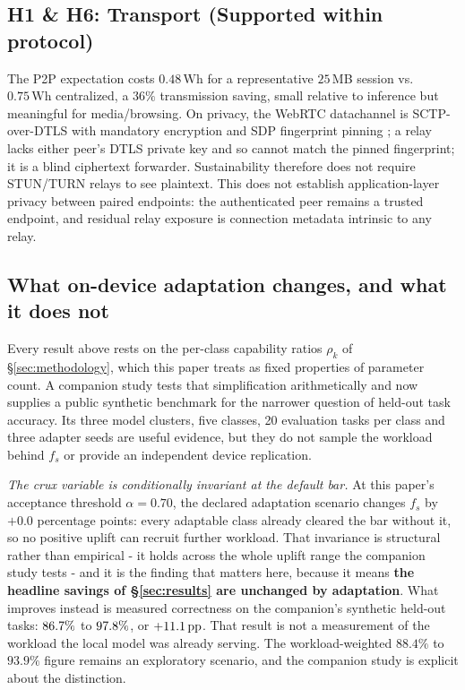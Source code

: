 \documentclass[conference]{IEEEtran}
\newcommand{\Wh}{\,\text{Wh}}
\newcommand{\pp}{\,\text{pp}}
\newcommand{\fs}{f_{s}}
\begin{document}
\subsection{H1 \& H6: Transport (Supported within protocol)}
The P2P expectation costs $0.48\Wh$ for a representative $25$\,MB session vs.\
$0.75\Wh$ centralized, a $36\%$ transmission saving, small relative to inference
but meaningful for media/browsing. On privacy, the WebRTC datachannel is
SCTP-over-DTLS with mandatory encryption and SDP fingerprint pinning
\cite{rfc8831,rfc8827}; a relay lacks either peer's DTLS private key and so
cannot match the pinned fingerprint; it is a blind ciphertext forwarder.
Sustainability therefore does not require STUN/TURN relays to see plaintext.
This does not establish application-layer privacy between paired endpoints:
the authenticated peer remains a trusted endpoint, and residual relay exposure is
connection metadata intrinsic to any relay.

\subsection{What on-device adaptation changes, and what it does not}
\label{sec:pass3}
Every result above rests on the per-class capability ratios $\rho_k$ of
\S\ref{sec:methodology}, which this paper treats as fixed properties of
parameter count. A companion study \cite{autoyou2026adaptation} tests that
simplification arithmetically and now supplies a public synthetic benchmark
for the narrower question of held-out task accuracy. Its three model clusters,
five classes, 20 evaluation tasks per class and three adapter seeds are useful
evidence, but they do not sample the workload behind $\fs$ or provide an
independent device replication.

\emph{The crux variable is conditionally invariant at the default bar.} At this
paper's acceptance threshold $\alpha=0.70$, the declared adaptation scenario changes $\fs$ by
$+0.0$ percentage points: every adaptable class already cleared the bar without
it, so no positive uplift can recruit further workload. That invariance is
structural rather than empirical - it holds across the whole uplift range the
companion study tests - and it is the finding that matters here, because it
means \textbf{the headline savings of \S\ref{sec:results} are unchanged by
adaptation}. What improves instead is measured correctness on the companion's
synthetic held-out tasks: $86.7\%$ to
$97.8\%$, or $+\AdaptationUplift\pp$. That result is
not a measurement of the workload the local model was already serving. The
workload-weighted $88.4\%$ to $93.9\%$ figure remains an exploratory scenario,
and the companion study is explicit about the distinction.
\end{document}
